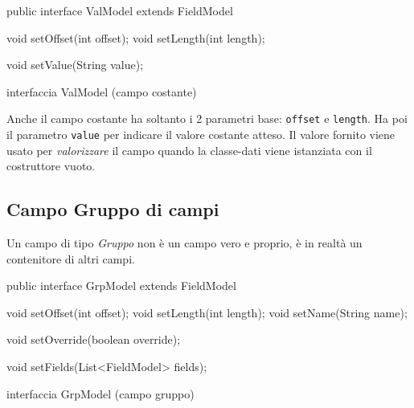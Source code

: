 \documentclass[a4paper,10pt]{report}
\newif\ifesource
\newenvironment{elisting}[1][!htb]
  {\captionsetup{aboveskip=0pt}\begin{listing}[#1]}
  {\end{listing}%
}
\begin{document}
\ifesource
\begin{figure*}[!htb]
\begin{lstlisting}[language=java, 
caption=interfaccia ValModel (campo costante), 
label=lst:ValModel]
public interface ValModel extends FieldModel {
    void setOffset(int offset);
    void setLength(int length);
    
    void setValue(String value);
}
\end{lstlisting}\index{ValModel}
\end{figure*}
\else
\begin{elisting}
\begin{javacode}
public interface ValModel extends FieldModel {
    void setOffset(int offset);
    void setLength(int length);
    
    void setValue(String value);
}
\end{javacode}
\caption{interfaccia ValModel (campo costante)}
\label{lst:ValModel}
\end{elisting}
\fi

Anche il campo costante ha soltanto i 2 parametri base: \verb!offset! e 
\verb!length!.
Ha poi il parametro \verb!value! per indicare il valore costante atteso.
Il valore fornito viene usato per \textit{valorizzare} il campo quando la 
classe-dati viene istanziata con il costruttore vuoto.

\subsection{Campo Gruppo di campi}
Un campo di tipo \textsl{Gruppo} non è un campo vero e proprio, è in realtà un
contenitore di altri campi.

\ifesource
\begin{figure*}[!htb]
\begin{lstlisting}[language=java, 
caption=interfaccia GrpModel (campo gruppo), 
label=lst:GrpModel]
public interface GrpModel extends FieldModel {
    void setOffset(int offset);
    void setLength(int length);
    void setName(String name);
    
    void setOverride(boolean override);
    
    void setFields(List<FieldModel> fields);
}
\end{lstlisting}\index{GrpModel}
\end{figure*}
\else
\begin{elisting}
\begin{javacode}
public interface GrpModel extends FieldModel {
    void setOffset(int offset);
    void setLength(int length);
    void setName(String name);
    
    void setOverride(boolean override);
    
    void setFields(List<FieldModel> fields);
}
\end{javacode}
\caption{interfaccia GrpModel (campo gruppo)}
\label{lst:GrpModel}
\end{elisting}
\fi
\end{document}
